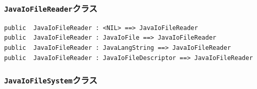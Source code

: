 \documentclass[\pformat,12pt]{jarticle}
\begin{document}
\subsubsection{\texttt{JavaIoFileReader}クラス}
\begin{small}
\begin{verbatim}
public  JavaIoFileReader : <NIL> ==> JavaIoFileReader
public  JavaIoFileReader : JavaIoFile ==> JavaIoFileReader
public  JavaIoFileReader : JavaLangString ==> JavaIoFileReader
public  JavaIoFileReader : JavaIoFileDescriptor ==> JavaIoFileReader
\end{verbatim}
\end{small}

\subsubsection{\texttt{JavaIoFileSystem}クラス}
\end{document}
